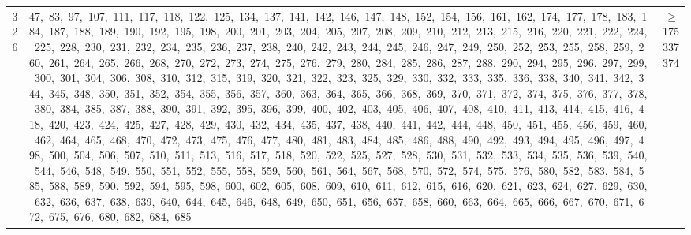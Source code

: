 \begin{longtable}{c|p{}|r}
326 & 47,\ 83,\ 97,\ 107,\ 111,\ 117,\ 118,\ 122,\ 125,\ 134,\ 137,\ 141,\ 142,\ 146,\ 147,\ 148,\ 152,\ 154,\ 156,\ 161,\ 162,\ 174,\ 177,\ 178,\ 183,\ 184,\ 187,\ 188,\ 189,\ 190,\ 192,\ 195,\ 198,\ 200,\ 201,\ 203,\ 204,\ 205,\ 207,\ 208,\ 209,\ 210,\ 212,\ 213,\ 215,\ 216,\ 220,\ 221,\ 222,\ 224,\ 225,\ 228,\ 230,\ 231,\ 232,\ 234,\ 235,\ 236,\ 237,\ 238,\ 240,\ 242,\ 243,\ 244,\ 245,\ 246,\ 247,\ 249,\ 250,\ 252,\ 253,\ 255,\ 258,\ 259,\ 260,\ 261,\ 264,\ 265,\ 266,\ 268,\ 270,\ 272,\ 273,\ 274,\ 275,\ 276,\ 279,\ 280,\ 284,\ 285,\ 286,\ 287,\ 288,\ 290,\ 294,\ 295,\ 296,\ 297,\ 299,\ 300,\ 301,\ 304,\ 306,\ 308,\ 310,\ 312,\ 315,\ 319,\ 320,\ 321,\ 322,\ 323,\ 325,\ 329,\ 330,\ 332,\ 333,\ 335,\ 336,\ 338,\ 340,\ 341,\ 342,\ 344,\ 345,\ 348,\ 350,\ 351,\ 352,\ 354,\ 355,\ 356,\ 357,\ 360,\ 363,\ 364,\ 365,\ 366,\ 368,\ 369,\ 370,\ 371,\ 372,\ 374,\ 375,\ 376,\ 377,\ 378,\ 380,\ 384,\ 385,\ 387,\ 388,\ 390,\ 391,\ 392,\ 395,\ 396,\ 399,\ 400,\ 402,\ 403,\ 405,\ 406,\ 407,\ 408,\ 410,\ 411,\ 413,\ 414,\ 415,\ 416,\ 418,\ 420,\ 423,\ 424,\ 425,\ 427,\ 428,\ 429,\ 430,\ 432,\ 434,\ 435,\ 437,\ 438,\ 440,\ 441,\ 442,\ 444,\ 448,\ 450,\ 451,\ 455,\ 456,\ 459,\ 460,\ 462,\ 464,\ 465,\ 468,\ 470,\ 472,\ 473,\ 475,\ 476,\ 477,\ 480,\ 481,\ 483,\ 484,\ 485,\ 486,\ 488,\ 490,\ 492,\ 493,\ 494,\ 495,\ 496,\ 497,\ 498,\ 500,\ 504,\ 506,\ 507,\ 510,\ 511,\ 513,\ 516,\ 517,\ 518,\ 520,\ 522,\ 525,\ 527,\ 528,\ 530,\ 531,\ 532,\ 533,\ 534,\ 535,\ 536,\ 539,\ 540,\ 544,\ 546,\ 548,\ 549,\ 550,\ 551,\ 552,\ 555,\ 558,\ 559,\ 560,\ 561,\ 564,\ 567,\ 568,\ 570,\ 572,\ 574,\ 575,\ 576,\ 580,\ 582,\ 583,\ 584,\ 585,\ 588,\ 589,\ 590,\ 592,\ 594,\ 595,\ 598,\ 600,\ 602,\ 605,\ 608,\ 609,\ 610,\ 611,\ 612,\ 615,\ 616,\ 620,\ 621,\ 623,\ 624,\ 627,\ 629,\ 630,\ 632,\ 636,\ 637,\ 638,\ 639,\ 640,\ 644,\ 645,\ 646,\ 648,\ 649,\ 650,\ 651,\ 656,\ 657,\ 658,\ 660,\ 663,\ 664,\ 665,\ 666,\ 667,\ 670,\ 671,\ 672,\ 675,\ 676,\ 680,\ 682,\ 684,\ 685 & $\ge$ 175337374 \\

\end{longtable}
